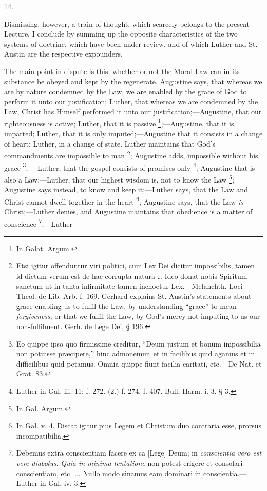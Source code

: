 14.

Dismissing, however, a train of thought, which scarcely belongs to
the present Lecture, I conclude by summing up the opposite
characteristics of the two systems of doctrine, which have been under
review, and of which Luther and St. Austin are the respective
expounders.

The main point in dispute is this; whether or not the Moral Law can
in its substance be obeyed and kept by the regenerate. Augustine says,
that whereas we are by nature condemned by the Law, we are enabled by
the grace of God to perform it unto our justification; Luther, that
whereas we are condemned by the Law, Christ has Himself performed it
unto our justification;—Augustine, that our righteousness is active;
Luther, that it is passive \footnote{In Galat.
Argum.};—Augustine,
that it is imparted; Luther, that it is only imputed;—Augustine that
it consists in a change of heart; Luther, in a change of state. Luther
maintains that God's commandments are impossible to man \footnote{Etsi igitur
offenduntur viri politici, cum Lex Dei dicitur impossibilis, tamen id
dictum verum est de hac corrupta natura … Ideo donat nobis Spiritum
sanctum ut in tanta infirmitate tamen inchoetur Lex.—Melanchth. Loci
Theol. de Lib. Arb. f. 169. Gerhard explains St. Austin's statements
about grace enabling us to fulfil the Law, by understanding
``grace'' to mean \emph{forgiveness}; or that we fulfil the
Law, by God's mercy not imputing to us our non-fulfilment. Gerh. de
Lege Dei, § 196.}; Augustine adds, impossible without his grace \footnote{Eo quippe
ipso quo firmissime creditur, ``Deum justum et bonum impossibilia
non potuisse præcipere,'' hinc admonemur, et in facilibus quid
agamus et in difficilibus quid petamus. Omnia quippe fiunt facilia
caritati, etc.—De Nat. et Grat. 83.}; —Luther, that the gospel consists of promises only \footnote{Luther in
Gal. iii. 11; f. 272. (2.) f. 274, f. 407. Bull, Harm. i. 3, § 3.}; Augustine that is also a Law;—Luther, that our highest
wisdom is, not to know the Law \footnote{In Gal. Argum.}; Augustine says instead, to know and keep it;—Luther says,
that the Law and Christ cannot dwell together in the heart \footnote{In Gal. v. 4.
Discat igitur pius Legem et Christum duo contraria esse, prorsus
incompatibilia.}; Augustine says, that the Law \emph{is} Christ;—Luther
denies, and Augustine maintains that obedience is a matter of
conscience \footnote{Debemus extra
conscientiam facere ex ca [Lege] Deum; in \emph{conscientia vero est vere
diabolus}. \emph{Quia in minima tentatione} non potest erigere et
consolari conscientiam, etc. ... Nullo modo sinamus eam dominari in
conscientia.—Luther in Gal. iv. 3.};—Luther
